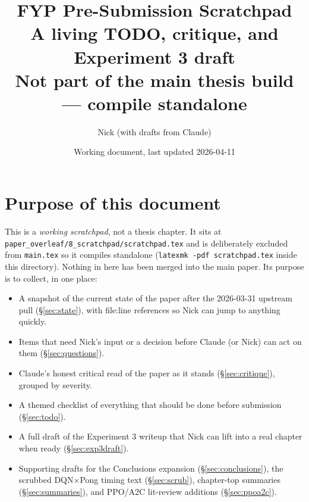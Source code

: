 \documentclass[11pt,a4paper]{article}
\title{\textbf{FYP Pre-Submission Scratchpad} \\
  \large A living TODO, critique, and Experiment 3 draft \\
  \normalsize Not part of the main thesis build --- compile standalone}
\author{Nick (with drafts from Claude)}
\date{Working document, last updated 2026-04-11}
\newcommand{\fileline}[1]{\texttt{\small #1}}
\begin{document}
\maketitle

\tableofcontents
\clearpage

\section{Purpose of this document}

This is a \emph{working scratchpad}, not a thesis chapter. It sits at
\fileline{paper\_overleaf/8\_scratchpad/scratchpad.tex} and is deliberately
excluded from \fileline{main.tex} so it compiles standalone (\fileline{latexmk
-pdf scratchpad.tex} inside this directory). Nothing in here has been merged
into the main paper. Its purpose is to collect, in one place:

\begin{itemize}[leftmargin=*]
  \item A snapshot of the current state of the paper after the 2026-03-31
  upstream pull (\S\ref{sec:state}), with file:line references so Nick can
  jump to anything quickly.
  \item Items that need Nick's input or a decision before Claude (or Nick)
  can act on them (\S\ref{sec:questions}).
  \item Claude's honest critical read of the paper as it stands
  (\S\ref{sec:critique}), grouped by severity.
  \item A themed checklist of everything that should be done before
  submission (\S\ref{sec:todo}).
  \item A full draft of the Experiment 3 writeup that Nick can lift into a
  real chapter when ready (\S\ref{sec:exp3draft}).
  \item Supporting drafts for the Conclusions expansion
  (\S\ref{sec:conclusions}), the scrubbed DQN$\times$Pong timing text
  (\S\ref{sec:scrub}), chapter-top summaries (\S\ref{sec:summaries}), and
  PPO/A2C lit-review additions (\S\ref{sec:ppoa2c}).
\end{itemize}
\end{document}
